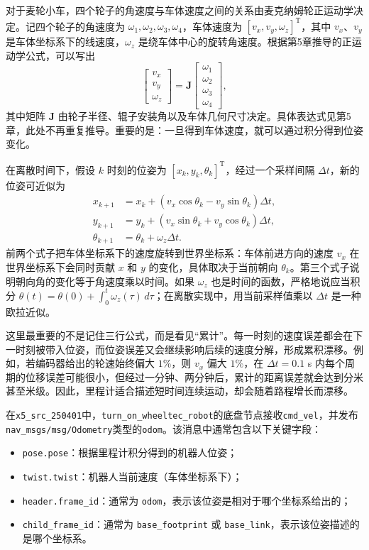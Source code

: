 \documentclass[UTF8,zihao=-4]{ctexart}
\DeclareRobustCommand{\code}[1]{\texttt{#1}}
\begin{document}
对于麦轮小车，四个轮子的角速度与车体速度之间的关系由麦克纳姆轮正运动学决定。记四个轮子的角速度为 $\omega_1,\omega_2,\omega_3,\omega_4$，车体速度为 $[v_x,v_y,\omega_z]^{\mathrm T}$，其中 $v_x$、$v_y$ 是车体坐标系下的线速度，$\omega_z$ 是绕车体中心的旋转角速度。根据第5章推导的正运动学公式，可以写出
\begin{equation}
\begin{bmatrix} v_x \\ v_y \\ \omega_z \end{bmatrix}
= \bm{J}
\begin{bmatrix} \omega_1 \\ \omega_2 \\ \omega_3 \\ \omega_4 \end{bmatrix},
\end{equation}
其中矩阵 $\bm{J}$ 由轮子半径、辊子安装角以及车体几何尺寸决定。具体表达式见第5章，此处不再重复推导。重要的是：一旦得到车体速度，就可以通过积分得到位姿变化。

在离散时间下，假设 $k$ 时刻的位姿为 $[x_k,y_k,\theta_k]^{\mathrm T}$，经过一个采样间隔 $\Delta t$，新的位姿可近似为
\begin{align}
x_{k+1}&=x_k+(v_x\cos\theta_k-v_y\sin\theta_k)\Delta t,\\
y_{k+1}&=y_k+(v_x\sin\theta_k+v_y\cos\theta_k)\Delta t,\\
\theta_{k+1}&=\theta_k+\omega_z\Delta t.
\end{align}
前两个式子把车体坐标系下的速度旋转到世界坐标系：车体前进方向的速度 $v_x$ 在世界坐标系下会同时贡献 $x$ 和 $y$ 的变化，具体取决于当前朝向 $\theta_k$。第三个式子说明朝向角的变化等于角速度乘以时间。如果 $\omega_z$ 也是时间的函数，严格地说应当积分 $\theta(t)=\theta(0)+\int_0^t \omega_z(\tau)\,d\tau$；在离散实现中，用当前采样值乘以 $\Delta t$ 是一种欧拉近似。

这里最重要的不是记住三行公式，而是看见“累计”。每一时刻的速度误差都会在下一时刻被带入位姿，而位姿误差又会继续影响后续的速度分解，形成累积漂移。例如，若编码器给出的轮速始终偏大 $1\%$，则 $v_x$ 偏大 $1\%$，在 $\Delta t=0.1$ s 内每个周期的位移误差可能很小，但经过一分钟、两分钟后，累计的距离误差就会达到分米甚至米级。因此，里程计适合描述短时间连续运动，却会随着路程增长而漂移。

在\code{x5\_src\_250401}中，\code{turn\_on\_wheeltec\_robot}的底盘节点接收\code{cmd\_vel}，并发布\code{nav\_msgs/msg/Odometry}类型的\code{odom}。该消息中通常包含以下关键字段：
\begin{itemize}
  \item \code{pose.pose}：根据里程计积分得到的机器人位姿；
  \item \code{twist.twist}：机器人当前速度（车体坐标系下）；
  \item \code{header.frame\_id}：通常为 \code{odom}，表示该位姿是相对于哪个坐标系给出的；
  \item \code{child\_frame\_id}：通常为 \code{base\_footprint} 或 \code{base\_link}，表示该位姿描述的是哪个坐标系。
\end{itemize}
\end{document}
